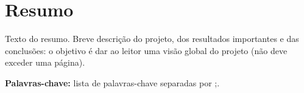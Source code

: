 \chapter*{Resumo}\label{ch:resumo}

Texto do resumo.
Breve descrição do projeto, dos resultados importantes e das conclusões: o objetivo é dar ao leitor uma visão global do projeto (não deve exceder uma página).

\textbf{Palavras-chave:} lista de palavras-chave separadas por ;.
